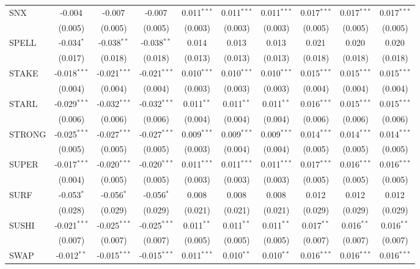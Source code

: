 \begin{table}[!htbp]
\begin{tabular}{@{\extracolsep{5pt}}lccccccccc}
 SNX & -0.004$^{}$ & -0.007$^{}$ & -0.007$^{}$ & 0.011$^{***}$ & 0.011$^{***}$ & 0.011$^{***}$ & 0.017$^{***}$ & 0.017$^{***}$ & 0.017$^{***}$ \\
  & (0.005) & (0.005) & (0.005) & (0.003) & (0.003) & (0.003) & (0.005) & (0.005) & (0.005) \\
 SPELL & -0.034$^{*}$ & -0.038$^{**}$ & -0.038$^{**}$ & 0.014$^{}$ & 0.013$^{}$ & 0.013$^{}$ & 0.021$^{}$ & 0.020$^{}$ & 0.020$^{}$ \\
  & (0.017) & (0.018) & (0.018) & (0.013) & (0.013) & (0.013) & (0.018) & (0.018) & (0.018) \\
 STAKE & -0.018$^{***}$ & -0.021$^{***}$ & -0.021$^{***}$ & 0.010$^{***}$ & 0.010$^{***}$ & 0.010$^{***}$ & 0.015$^{***}$ & 0.015$^{***}$ & 0.015$^{***}$ \\
  & (0.004) & (0.004) & (0.004) & (0.003) & (0.003) & (0.003) & (0.004) & (0.004) & (0.004) \\
 STARL & -0.029$^{***}$ & -0.032$^{***}$ & -0.032$^{***}$ & 0.011$^{**}$ & 0.011$^{**}$ & 0.011$^{**}$ & 0.016$^{***}$ & 0.015$^{***}$ & 0.015$^{***}$ \\
  & (0.006) & (0.006) & (0.006) & (0.004) & (0.004) & (0.004) & (0.006) & (0.006) & (0.006) \\
 STRONG & -0.025$^{***}$ & -0.027$^{***}$ & -0.027$^{***}$ & 0.009$^{***}$ & 0.009$^{***}$ & 0.009$^{***}$ & 0.014$^{***}$ & 0.014$^{***}$ & 0.014$^{***}$ \\
  & (0.005) & (0.005) & (0.005) & (0.003) & (0.004) & (0.004) & (0.005) & (0.005) & (0.005) \\
 SUPER & -0.017$^{***}$ & -0.020$^{***}$ & -0.020$^{***}$ & 0.011$^{***}$ & 0.011$^{***}$ & 0.011$^{***}$ & 0.017$^{***}$ & 0.016$^{***}$ & 0.016$^{***}$ \\
  & (0.004) & (0.005) & (0.005) & (0.003) & (0.003) & (0.003) & (0.005) & (0.005) & (0.005) \\
 SURF & -0.053$^{*}$ & -0.056$^{*}$ & -0.056$^{*}$ & 0.008$^{}$ & 0.008$^{}$ & 0.008$^{}$ & 0.012$^{}$ & 0.012$^{}$ & 0.012$^{}$ \\
  & (0.028) & (0.029) & (0.029) & (0.021) & (0.021) & (0.021) & (0.029) & (0.029) & (0.029) \\
 SUSHI & -0.021$^{***}$ & -0.025$^{***}$ & -0.025$^{***}$ & 0.011$^{**}$ & 0.011$^{**}$ & 0.011$^{**}$ & 0.017$^{**}$ & 0.016$^{**}$ & 0.016$^{**}$ \\
  & (0.007) & (0.007) & (0.007) & (0.005) & (0.005) & (0.005) & (0.007) & (0.007) & (0.007) \\
 SWAP & -0.012$^{**}$ & -0.015$^{***}$ & -0.015$^{***}$ & 0.011$^{***}$ & 0.010$^{**}$ & 0.010$^{**}$ & 0.016$^{***}$ & 0.016$^{***}$ & 0.016$^{***}$ \\

\end{tabular}
\end{table}
